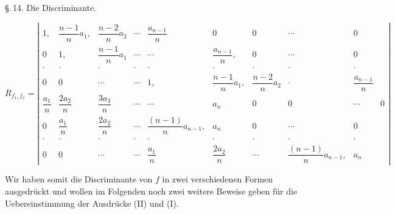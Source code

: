
\S.\,14. Die Discriminante.

\[
R_{f_1,f_2} =
\left|
\begin{array}{cccccccccc}
1, & \dfrac{n-1}{n}a_1, & \dfrac{n-2}{n}a_2 & \cdots & \dfrac{a_{n-1}}{n} & 0 & 0 & \cdots & 0 \\[2ex]
0 & 1, & \dfrac{n-1}{n}a_1 & \cdots & \cdots & \dfrac{a_{n-1}}{n}, & 0 & \cdots & 0 \\[2ex]
\cdot & \cdot & \cdot & \cdot & \cdot & \cdot & \cdot & \cdot & \cdot \\[1ex]
0 & 0 & \cdots & \cdots & 1, & \dfrac{n-1}{n}a_1, & \dfrac{n-2}{n}a_2 & \cdot & \dfrac{a_{n-1}}{n} \\[2ex]
\dfrac{a_1}{n} & \dfrac{2a_2}{n} & \dfrac{3a_3}{n} & \cdots & \cdots & a_n & 0 & 0 & \cdots & 0 \\[2ex]
0 & \dfrac{a_1}{n} & \dfrac{2a_2}{n} & \cdots & \dfrac{(n-1)}{n}a_{n-1}, & a_n & 0 & \cdots & 0 \\[2ex]
\cdot & \cdot & \cdot & \cdot & \cdot & \cdot & \cdot & \cdot & \cdot \\[1ex]
0 & 0 & \cdots & \cdots & \dfrac{a_1}{n} & \dfrac{2a_2}{n} & \cdots & \dfrac{(n-1)}{n}a_{n-1}, & a_n
\end{array}
\right| \tag{II}
\]

Wir haben somit die Discriminante von $f$ in zwei verschiedenen Formen ausgedrückt und wollen im Folgenden noch zwei weitere Beweise geben für die Uebereinstimmung der Ausdrücke (II) und (I).

